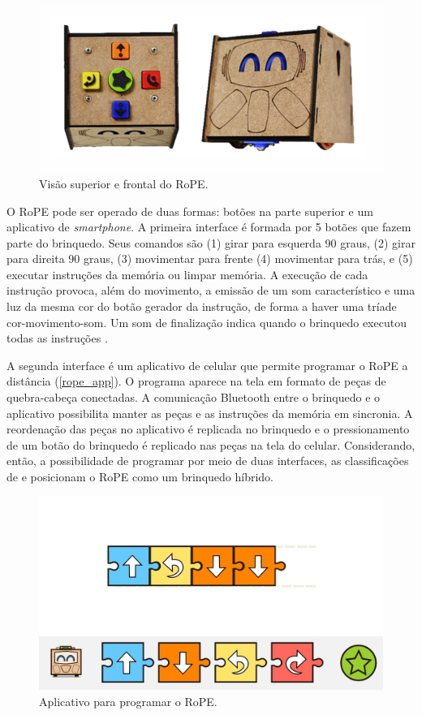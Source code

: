 \begin{figure}[!htpb]
  \centering
  \includegraphics[width=.9\linewidth,fbox]{figs/rope_up_front.png}
  \caption{Visão superior e frontal do RoPE.}
  \label{rope}
\end{figure}
O RoPE pode ser operado de duas formas: botões na parte superior e um aplicativo de \textit{smartphone}. A primeira interface é formada por 5 botões que fazem parte do brinquedo. Seus comandos são (1) girar para esquerda 90 graus, (2) girar para direita 90 graus, (3) movimentar para frente (4) movimentar para trás, e (5) executar instruções da memória ou limpar memória. A execução de cada instrução provoca, além do movimento, a emissão de um som característico e uma luz da mesma cor do botão gerador da instrução, de forma a haver uma tríade cor-movimento-som. Um som de finalização indica quando o brinquedo executou todas as instruções \cite{raabe_rope_2017}.

A segunda interface é um aplicativo de celular que permite programar o RoPE a distância (\autoref{rope_app}). O programa aparece na tela em formato de peças de quebra-cabeça conectadas. A comunicação Bluetooth entre o brinquedo e o aplicativo possibilita manter as peças e as instruções da memória em sincronia. A reordenação das peças no aplicativo é replicada no brinquedo e o pressionamento de um botão do brinquedo é replicado nas peças na tela do celular. Considerando, então, a possibilidade de programar por meio de duas interfaces, as classificações de  e  posicionam o RoPE como um brinquedo híbrido.

\begin{figure}[!htpb]
  \centering
  \includegraphics[width=.9\linewidth,fbox]{figs/app.jpg}
  \caption{Aplicativo para programar o RoPE.}
  \sourceauthor
  \label{rope_app}
\end{figure}

